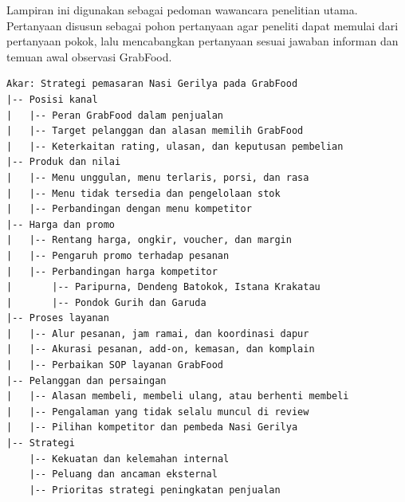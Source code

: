 \label{app:pedoman-wawancara-utama}

Lampiran ini digunakan sebagai pedoman wawancara penelitian utama. Pertanyaan disusun sebagai pohon pertanyaan agar peneliti dapat memulai dari pertanyaan pokok, lalu mencabangkan pertanyaan sesuai jawaban informan dan temuan awal observasi GrabFood.

\begin{flushleft}
\scriptsize
\begin{verbatim}
Akar: Strategi pemasaran Nasi Gerilya pada GrabFood
|-- Posisi kanal
|   |-- Peran GrabFood dalam penjualan
|   |-- Target pelanggan dan alasan memilih GrabFood
|   |-- Keterkaitan rating, ulasan, dan keputusan pembelian
|-- Produk dan nilai
|   |-- Menu unggulan, menu terlaris, porsi, dan rasa
|   |-- Menu tidak tersedia dan pengelolaan stok
|   |-- Perbandingan dengan menu kompetitor
|-- Harga dan promo
|   |-- Rentang harga, ongkir, voucher, dan margin
|   |-- Pengaruh promo terhadap pesanan
|   |-- Perbandingan harga kompetitor
|       |-- Paripurna, Dendeng Batokok, Istana Krakatau
|       |-- Pondok Gurih dan Garuda
|-- Proses layanan
|   |-- Alur pesanan, jam ramai, dan koordinasi dapur
|   |-- Akurasi pesanan, add-on, kemasan, dan komplain
|   |-- Perbaikan SOP layanan GrabFood
|-- Pelanggan dan persaingan
|   |-- Alasan membeli, membeli ulang, atau berhenti membeli
|   |-- Pengalaman yang tidak selalu muncul di review
|   |-- Pilihan kompetitor dan pembeda Nasi Gerilya
|-- Strategi
    |-- Kekuatan dan kelemahan internal
    |-- Peluang dan ancaman eksternal
    |-- Prioritas strategi peningkatan penjualan
\end{verbatim}
\end{flushleft}

